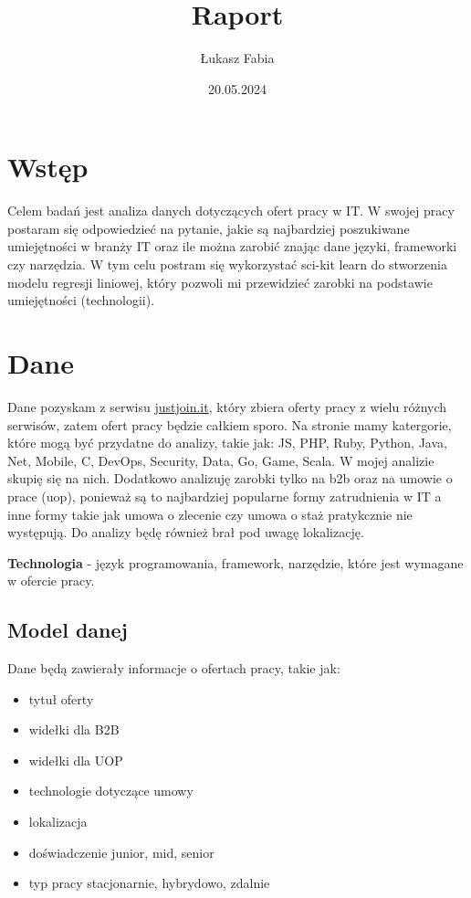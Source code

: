 \documentclass{article}
\title{Raport}
\author{Łukasz Fabia}
\date{20.05.2024}
\begin{document}
\maketitle
\tableofcontents

\section{Wstęp}

\quad Celem badań jest analiza danych dotyczących ofert pracy w IT. W swojej pracy postaram się
odpowiedzieć na pytanie, jakie są najbardziej poszukiwane umiejętności w branży IT oraz ile można zarobić
znając dane języki, frameworki czy narzędzia. W tym celu postram się wykorzystać sci-kit learn do stworzenia
modelu regresji liniowej, który pozwoli mi przewidzieć zarobki na podstawie umiejętności (technologii).


\section{Dane}

\quad Dane pozyskam z serwisu \href{https://justjoin.it/}{justjoin.it}, który zbiera oferty pracy z wielu różnych serwisów, zatem
ofert pracy będzie całkiem sporo. Na stronie mamy katergorie, które mogą być przydatne do analizy, takie jak:
JS, PHP, Ruby, Python, Java, Net, Mobile, C, DevOps, Security, Data, Go, Game, Scala. W mojej analizie skupię się na nich.
\quad Dodatkowo analizuję zarobki tylko na b2b oraz na umowie o prace (uop), ponieważ są to najbardziej popularne formy zatrudnienia w IT a inne formy takie jak umowa
o zlecenie czy umowa o staż pratykcznie nie występują. Do analizy będę również brał pod uwagę lokalizację.

\textbf{\newline Technologia} - język programowania, framework, narzędzie, które jest wymagane w ofercie pracy.

\subsection{Model danej}
\quad Dane będą zawierały informacje o ofertach pracy, takie jak:
\begin{itemize}
    \item tytuł oferty
    \item widełki dla B2B
    \item widełki dla UOP
    \item technologie dotyczące umowy
    \item lokalizacja
    \item doświadczenie {junior, mid, senior}
    \item typ pracy {stacjonarnie, hybrydowo, zdalnie}
\end{itemize}
\end{document}
